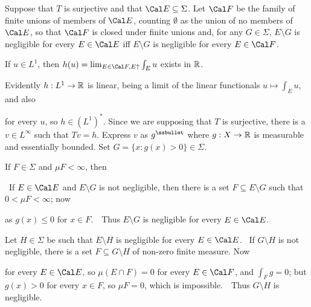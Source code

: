 {\medskip
     
 Suppose that $T$ is surjective and that $\Cal
E\subseteq\Sigma$.   Let $\Cal F$ be the family of finite unions of
members of $\Cal E$, counting $\emptyset$ as the union of no members of
$\Cal E$, so that $\Cal F$ is closed under finite unions and, for any
$G\in\Sigma$, $E\setminus G$ is negligible for every $E\in\Cal E$ iff
$E\setminus G$ is negligible for every $E\in\Cal F$.
     
If $u\in L^1$, then $h(u)=\lim_{E\in\Cal F,E\uparrow}\int_Eu$ exists in
$\Bbb R$.   
     
Evidently $h:L^1\to\Bbb R$ is linear, being a limit of the linear
functionals $u\mapsto\int_Eu$, and also
     
     
\noindent for every $u$, so $h\in(L^1)^*$.
Since we are supposing that $T$ is surjective, there is a $v\in
L^{\infty}$ such that $Tv=h$.   Express $v$ as $g^{\ssbullet}$ where
$g:X\to\Bbb R$ is measurable and essentially bounded.   Set
$G=\{x:g(x)>0\}\in\Sigma$.
     
If $F\in\Sigma$ and $\mu F<\infty$, then
     
\Quer\ If $E\in\Cal E$ and $E\setminus G$ is not negligible, then there
is a set $F\subseteq E\setminus G$ such that $0<\mu F<\infty$;  now
     
     
     
\noindent as $g(x)\le 0$ for $x\in F$.\ \BanG\  Thus $E\setminus G$ is
negligible for every $E\in\Cal E$.
     
Let $H\in\Sigma$ be such that $E\setminus H$ is negligible for every
$E\in\Cal E$.   \Quer\ If $G\setminus H$ is not negligible, there is a
set $F\subseteq G\setminus H$ of non-zero finite measure.   Now
     
     
     
\noindent for every $E\in\Cal E$, so $\mu(E\cap F)=0$ for every $E\in\Cal F$, and $\int_Fg=0$;  but $g(x)>0$ for every
$x\in F$, so $\mu F=0$, which is impossible.\ \BanG\   Thus 
$G\setminus H$ is negligible.
     
}

